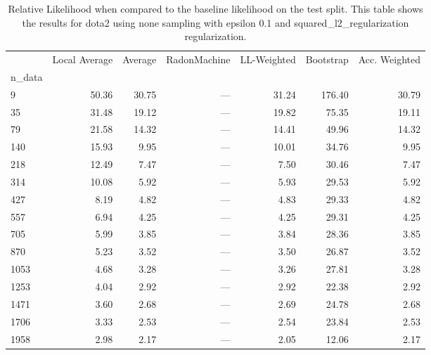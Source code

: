 \begin{table}
\centering
\caption{Relative Likelihood when compared to the baseline likelihood on the test split. This table shows the results for  dota2 using  none sampling with epsilon  0.1 and  squared_l2_regularization regularization.}
\label{tab:2}
\begin{tabular}{lrrrrrr}
\toprule
{} &  Local Average &  Average &  RadonMachine &  LL-Weighted &  Bootstrap &  Acc. Weighted \\
n\_data &                &          &               &              &            &                \\
\midrule
9      &          50.36 &    30.75 &           --- &        31.24 &     176.40 &          30.79 \\
35     &          31.48 &    19.12 &           --- &        19.82 &      75.35 &          19.11 \\
79     &          21.58 &    14.32 &           --- &        14.41 &      49.96 &          14.32 \\
140    &          15.93 &     9.95 &           --- &        10.01 &      34.76 &           9.95 \\
218    &          12.49 &     7.47 &           --- &         7.50 &      30.46 &           7.47 \\
314    &          10.08 &     5.92 &           --- &         5.93 &      29.53 &           5.92 \\
427    &           8.19 &     4.82 &           --- &         4.83 &      29.33 &           4.82 \\
557    &           6.94 &     4.25 &           --- &         4.25 &      29.31 &           4.25 \\
705    &           5.99 &     3.85 &           --- &         3.84 &      28.36 &           3.85 \\
870    &           5.23 &     3.52 &           --- &         3.50 &      26.87 &           3.52 \\
1053   &           4.68 &     3.28 &           --- &         3.26 &      27.81 &           3.28 \\
1253   &           4.04 &     2.92 &           --- &         2.92 &      22.38 &           2.92 \\
1471   &           3.60 &     2.68 &           --- &         2.69 &      24.78 &           2.68 \\
1706   &           3.33 &     2.53 &           --- &         2.54 &      23.84 &           2.53 \\
1958   &           2.98 &     2.17 &           --- &         2.05 &      12.06 &           2.17 \\
\bottomrule
\end{tabular}
\end{table}
